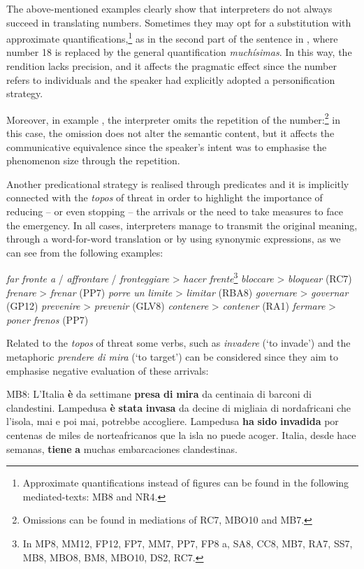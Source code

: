 \documentclass[output=paper]{langscibook}
\begin{document}
The above-mentioned examples clearly show that interpreters do not always succeed in translating numbers. Sometimes they may opt for a substitution with approximate quantifications,\footnote{Approximate quantifications instead of figures can be found in the following mediated-texts: MB8 and NR4.} as in the second part of the sentence in , where number 18 is replaced by the general quantification \textit{muchísimas}. In this way, the rendition lacks precision, and it affects the pragmatic effect since the number refers to individuals and the speaker had explicitly adopted a personification strategy.

Moreover, in example , the interpreter omits the repetition of the number:\footnote{Omissions can be found in mediations of RC7, MBO10 and MB7.} in this case, the omission does not alter the semantic content, but it affects the communicative equivalence since the speaker’s intent was to emphasise the phenomenon size through the repetition.

Another predicational strategy is realised through predicates and it is implicitly connected with the \textit{topos} of threat in order to highlight the importance of reducing -- or even stopping -- the arrivals or the need to take measures to face the emergency. In all cases, interpreters manage to transmit the original meaning, through a word-for-word translation or by using synonymic expressions, as we can see from the following examples:

\ea\label{ex:mori:14}
\ea
\textit{far fronte a} / \textit{affrontare} / \textit{fronteggiare} > \textit{hacer frente}\footnote{In MP8, MM12, FP12, FP7, MM7, PP7, FP8 a, SA8, CC8, MB7, RA7, SS7, MB8, MBO8, BM8, MBO10, DS2, RC7.}
\ex
\textit{bloccare} > \textit{bloquear} (RC7)
\ex
\textit{frenare} > \textit{frenar} (PP7)
\ex
\textit{porre un limite} > \textit{limitar} (RBA8)
\ex
\textit{governare} > \textit{governar} (GP12)
\ex
\textit{prevenire} > \textit{prevenir} (GLV8)
\ex
\textit{contenere} > \textit{contener} (RA1)
\ex
\textit{fermare} > \textit{poner frenos} (PP7)
\z
\z

Related to the \textit{topos} of threat some verbs, such as \textit{invadere} (‘to invade’) and the metaphoric \textit{prendere di mira} (‘to target’) can be considered since they aim to emphasise negative evaluation of these arrivals:

\ea\label{ex:mori:15}
\ea
MB8: L'Italia \textbf{è} da settimane \textbf{presa} \textbf{di} \textbf{mira} da centinaia di barconi di clandestini. Lampedusa \textbf{è} \textbf{stata} \textbf{invasa} da decine di migliaia di nordafricani che l'isola, mai e poi mai, potrebbe accogliere.
\ex
Lampedusa \textbf{ha} \textbf{sido} \textbf{invadida} por centenas de miles de norteafricanos que la isla no puede acoger. Italia, desde hace semanas, \textbf{tiene} \textbf{a} muchas embarcaciones clandestinas.
\z
\z
\end{document}
